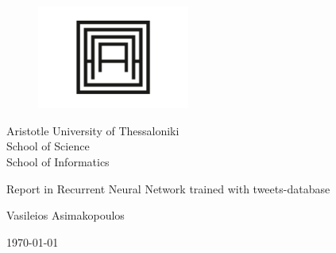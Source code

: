 \begin{titlepage}
	\afterpage{\blankpage}	
	\begin{figure}[H]
		\begin{center}
			\includegraphics[width=5cm]{Results/AUTH-01.jpg}
			\label{fig:cover_auth_logo}
		\end{center}
	\end{figure}
	
	\centering
	\Large Aristotle University of Thessaloniki \\
	\Large School of Science\\
	\large School of Informatics\\
	
	
	\vspace{\fill}
	
	\LARGE Report in Recurrent Neural Network trained with tweets-database
	
	\vspace{\fill}
	
	Vasileios Asimakopoulos
	
	
	
	\centering
	
	\today
	
\end{titlepage}
